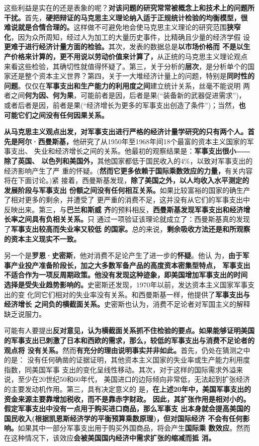 这些利益是实在的还是表象的呢？\textbf{对该问题的研究常常被概念上和技术上的问题所
  干扰。}首先，\textbf{硬把辩证的马克思主义理论纳入适于正规统计检验的均衡模型，很
  难说就是合情合理的。}这样做不可避免地会使马克思主义理论的研究范围\textbf{狭窄
  化}，因为众所周知，经过人为加工的大量历史事件，比精确且少量的经济学假
设\textbf{更难于进行经济计量方面的检验。}其次，发表的数据总是\textbf{以市场价格而
  不是以生产价格来计算的，更不用说以劳动价值来计算了，}从正统的马克思主义理论观点
来看这些检验，其确切性就值得怀疑了。第三，关于分析的\textbf{层次}，是分析单个的国
家还是整个资本主义世界？第四，关于一大堆经济计量上的问题，特别是\textbf{同时性的
  问题}。仅仅在\textbf{军事支出和生产能力的利用度之间}建立统计关系，丝毫不能说明
两者之间\textbf{何为因、何为果}，可能前者是因，后者是果(“装备新的武器促进需求”)，
或者后者是因，前者是果(“经济增长为更多的军事支出创造了条件”)；当然，\textbf{也
  可能它们之间没有任何因果关系。}

\textbf{从马克思主义观点出发，对军事支出进行严格的经济计量学研究的只有两个人。首
  先是阿尔·西曼斯基，}他研究了从1950年至1968年间18个最富的资本主义国家的军事支出、
失业和经济增长之间的关系。他最初的观察结果是：\textbf{军事支出很小――除了英国、
  以色列和美国外，}其他国家都低于国民收入的4\%，以致对军事支出的经济影响产生了严
重的怀疑。(\textbf{然而它更多依赖于国际乘数效应的力量，}有关内容将在下面讨论。)紧
接着，西曼斯基发现，\textbf{除了美国之外，以人均收入水平测定的发展阶段与军事支出
  份额之间没有任何相互关系。}如果比较富裕的国家的确生产了相对更多的剩余，并遭受了
更严重的消费不足，这并没有从它们的军事支出中反映出来。第三，与\textbf{巴兰和斯威
  齐}的预料相反，\textbf{西曼斯基发现军事支出和经济增长率之间具有负相关关系。}只
通过一项验证该理论就成立了：西曼斯基真的发现了\textbf{军事支出较高而失业率又较低
  的国家。}总的来说，\textbf{剩余吸收方法还是和所观察的资本主义现实不一致。}

另一个是\textbf{罗恩·史密斯}，他对消费不足论产生了进一步的\textbf{怀疑}。他认
为，\textbf{由于军事产业投产准备阶段长，加之大多数军备产品的高度资本密集型特点，
  军事支出不适合作为一项反周期政策。他没有发现这种迹象，即美国增加军事支出的时间
  选择是受失业趋势影响的。}史密斯还发现，1970年以前，发达资本主义国家军事支出的变
化同它们相对的失业率没有关系。和西曼斯基一样，他提供了\textbf{军事支出与经济增长
  之间负的横截面关系。}史密斯也认为，消费不足论者对军国主义的解释缺乏说服力。

可能有人要提出\textbf{反对意见，认为横截面关系抓不住检验的要点。如果能够证明美国
  的军事支出已刺激了日本和西欧的需求，那么，较低的军事支出与消费不足论者的观点将
  没有关系。}然而\textbf{有充分的理由说明事实并非如此。}首先，仍处在猜测之中的是：
没有任何确凿的证据证明，其他资本主义国家的失业率或生产能力利用度指数，同美国军事
支出的变化呈线性移动。其次，对于这样的国际需求外溢来说，至少在20世纪50和60年代，
美国进口的边际倾向非常低，无法起到扩张经济的主要发动机作用。第三，具有决定意义的
是，\textbf{在上述20年中，美国军事支出的资金来源主要靠增加税收，而不是靠赤字财政。
  因此，其扩张作用是相对小的。假定军事支出中没有一点用于购买进口商品，那么军事支
  出本身就会提高美国的国民收入(根据凯恩斯经济学的平衡预算乘数原理)，但对国际经济
  不会有任何影响。}如果其中一部分军事支出用于购买外国商品，将会产生\textbf{国际乘
  数效应}。然而在这种情况下，该效应\textbf{会被美国国内经济中需求扩张的缩减而抵
  消。}

